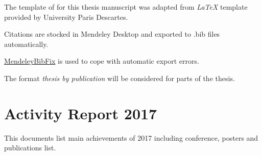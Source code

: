 \documentclass[12pt,]{book}
\theoremstyle{definition}
\theoremstyle{definition}
\theoremstyle{definition}
\theoremstyle{remark}
\begin{document}
The template of for this thesis manuscript was adapted from \emph{LaTeX}
template provided by University Paris Descartes.

Citations are stocked in Mendeley Desktop and exported to .bib files
automatically.

\href{https://ramblingacademic.com/2016/06/fixing-bibtex-files-mendeley/}{MendeleyBibFix}
is used to cope with automatic export errors.

The format \emph{thesis by publication} will be considered for parts of
the thesis.

\newpage

\hypertarget{activity-report-2017}{%
\section*{Activity Report 2017}\label{activity-report-2017}}

This documents list main achievements of 2017 including conference,
posters and publications list.




\end{document}
